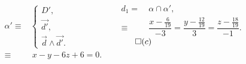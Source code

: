 \documentclass[10pt]{beamer}
\newcommand{\vect}[1] {
  \overrightarrow{#1}}
\begin{document}
{\begin{columns}[c]
		\flushleft 
		\onslide<+->
		\begin{align*}
		\alpha' \equiv& \begin{cases}
		                D', \\
		                \vect{d'}, \\
		                \vect{d} \wedge \vect{d'}.
		               \end{cases} \\
		       \equiv&\ x-y-6z + 6=0.
		\end{align*}
		
		\flushleft 
		\onslide<+->
		\begin{align*}
		 d_1      =&\ \alpha \cap \alpha ', \\
		     \equiv&\ \dfrac{x-\frac{6}{19}}{-3} = \dfrac{y-\frac{12}{19}}{3} = \dfrac{z - \frac{18}{19}}{-1}.
		\end{align*}
		\hfill $\qed(c)$\hspace{-3mm}
		\vspace{-3mm}
		
		\end{columns}
		
    }
	  
  
\end{document}
